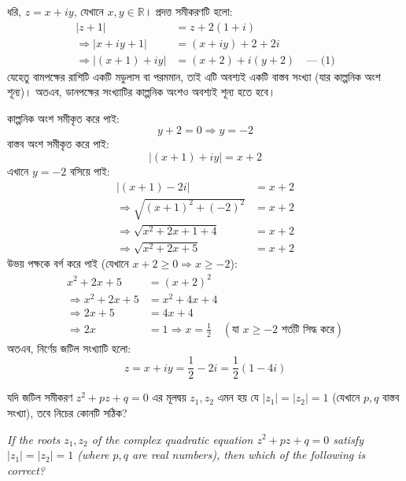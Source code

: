 \documentclass[12pt, a4paper]{article}
\begin{document}
\begin{tcolorbox}[solutionbox={সমাধান (Solution)}]
    \noindent
    ধরি, $z = x + iy$, যেখানে $x, y \in \mathbb{R}$। প্রদত্ত সমীকরণটি হলো:
    \begin{align*}
        |z+1| &= z + 2(1+i) \\
        \Rightarrow |x + iy + 1| &= (x + iy) + 2 + 2i \\
        \Rightarrow |(x+1) + iy| &= (x + 2) + i(y + 2) \quad \text{--- (1)}
    \end{align*}
    যেহেতু বামপক্ষের রাশিটি একটি মডুলাস বা পরমমান, তাই এটি অবশ্যই একটি বাস্তব সংখ্যা (যার কাল্পনিক অংশ শূন্য)। অতএব, ডানপক্ষের সংখ্যাটির কাল্পনিক অংশও অবশ্যই শূন্য হতে হবে। 
    
    কাল্পনিক অংশ সমীকৃত করে পাই:
    \[ y + 2 = 0 \Rightarrow y = -2 \]
    বাস্তব অংশ সমীকৃত করে পাই:
    \[ |(x+1) + iy| = x + 2 \]
    এখানে $y = -2$ বসিয়ে পাই:
    \begin{align*}
        |(x+1) - 2i| &= x + 2 \\
        \Rightarrow \sqrt{(x+1)^2 + (-2)^2} &= x + 2 \\
        \Rightarrow \sqrt{x^2 + 2x + 1 + 4} &= x + 2 \\
        \Rightarrow \sqrt{x^2 + 2x + 5} &= x + 2
    \end{align*}
    উভয় পক্ষকে বর্গ করে পাই (যেখানে $x + 2 \geq 0 \Rightarrow x \geq -2$):
    \begin{align*}
        x^2 + 2x + 5 &= (x + 2)^2 \\
        \Rightarrow x^2 + 2x + 5 &= x^2 + 4x + 4 \\
        \Rightarrow 2x + 5 &= 4x + 4 \\
        \Rightarrow 2x &= 1 \Rightarrow x = \frac{1}{2} \quad (\text{যা } x \geq -2 \text{ শর্তটি সিদ্ধ করে})
    \end{align*}
    অতএব, নির্ণেয় জটিল সংখ্যাটি হলো:
    \[ z = x + iy = \frac{1}{2} - 2i = \frac{1}{2}(1 - 4i) \]
\end{tcolorbox}
\begin{tcolorbox}[questionbox={প্রশ্ন (Question) 7}]
    \noindent
    যদি জটিল সমীকরণ $z^2 + pz + q = 0$ এর মূলদ্বয় $z_1, z_2$ এমন হয় যে $|z_1| = |z_2| = 1$ (যেখানে $p, q$ বাস্তব সংখ্যা), তবে নিচের কোনটি সঠিক?
    
    \vspace{0.8em}
    \begin{english}
    \noindent\textit{\color{darkgray}
    If the roots $z_1, z_2$ of the complex quadratic equation $z^2 + pz + q = 0$ satisfy $|z_1| = |z_2| = 1$ (where $p, q$ are real numbers), then which of the following is correct?
    }
    \end{english}
\end{tcolorbox}
\end{document}
